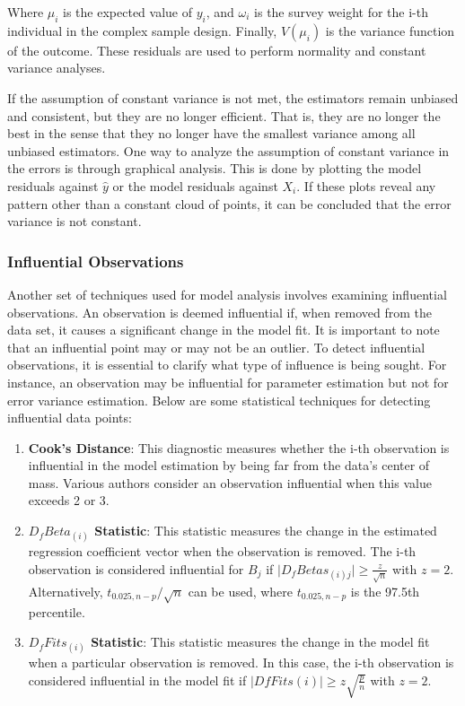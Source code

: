 \documentclass[
  12pt,
]{book}
\providecommand{\tightlist}{%
  \setlength{\itemsep}{0pt}\setlength{\parskip}{0pt}}
\begin{document}
Where \(\mu_{i}\) is the expected value of \(y_{i}\), and \(\omega_{i}\) is the survey weight for the i-th individual in the complex sample design. Finally, \(V(\mu_{i})\) is the variance function of the outcome. These residuals are used to perform normality and constant variance analyses.

If the assumption of constant variance is not met, the estimators remain unbiased and consistent, but they are no longer efficient. That is, they are no longer the best in the sense that they no longer have the smallest variance among all unbiased estimators. One way to analyze the assumption of constant variance in the errors is through graphical analysis. This is done by plotting the model residuals against \(\hat{y}\) or the model residuals against \(X_{i}\). If these plots reveal any pattern other than a constant cloud of points, it can be concluded that the error variance is not constant.

\hypertarget{influential-observations}{%
\subsubsection{Influential Observations}\label{influential-observations}}

Another set of techniques used for model analysis involves examining influential observations. An observation is deemed influential if, when removed from the data set, it causes a significant change in the model fit. It is important to note that an influential point may or may not be an outlier. To detect influential observations, it is essential to clarify what type of influence is being sought. For instance, an observation may be influential for parameter estimation but not for error variance estimation. Below are some statistical techniques for detecting influential data points:

\begin{enumerate}
\def\labelenumi{\arabic{enumi}.}
\tightlist
\item
  \textbf{Cook's Distance}: This diagnostic measures whether the i-th observation is influential in the model estimation by being far from the data's center of mass. Various authors consider an observation influential when this value exceeds 2 or 3.
\item
  \textbf{\(D_fBeta_{(i)}\) Statistic}: This statistic measures the change in the estimated regression coefficient vector when the observation is removed. The i-th observation is considered influential for \(B_j\) if \(\mid D_{f}Betas_{\left(i\right)j}\mid \geq \frac{z}{\sqrt{n}}\) with \(z = 2\). Alternatively, \(t_{0.025,n-p}/\sqrt{n}\) can be used, where \(t_{0.025,n-p}\) is the 97.5th percentile.
\item
  \textbf{\(D_{f}Fits_{\left(i\right)}\) Statistic}: This statistic measures the change in the model fit when a particular observation is removed. In this case, the i-th observation is considered influential in the model fit if \(\mid DfFits\left(i\right)\mid \geq z\sqrt{\frac{p}{n}}\) with \(z = 2\).
\end{enumerate}
\end{document}
